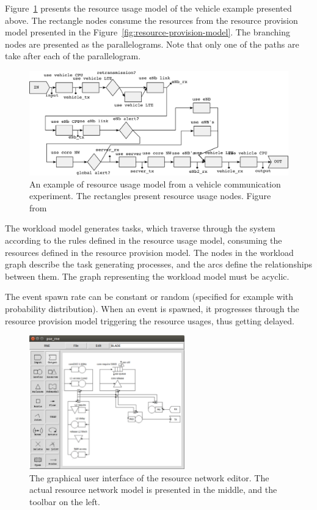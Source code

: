 Figure~\ref{fig:resource-usage-model} presents the resource usage model of the vehicle example presented above. The rectangle nodes consume the resources from the resource provision model presented in the Figure~\ref{fig:resource-provision-model}. The branching nodes are presented as the parallelograms. Note that only one of the paths are take after each of the parallelogram.

\begin{figure}[]
  \begin{center}
    \includegraphics[width=\textwidth]{images/pse-models/pse-tg-example.pdf}
    \caption{An example of resource usage model from a vehicle communication experiment. The rectangles present resource usage nodes. Figure from~\cite{Hanhirova:2014:PSE}}
    \label{fig:resource-usage-model}
  \end{center}
\end{figure}

The workload model generates tasks, which traverse through the system according to the rules defined in the resource usage model, consuming the resources defined in the resource provision model. The nodes in the workload graph describe the task generating processes, and the arcs define the relationships between them. The graph representing the workload model must be acyclic.

The event spawn rate can be constant or random (specified for example with probability distribution). When an event is spawned, it progresses through the resource provision model triggering the resource usages, thus getting delayed.

\begin{figure}[]
  \begin{center}
    \includegraphics[width=0.6\textwidth]{images/rne-example.pdf}
    \caption{The graphical user interface of the resource network editor. The actual resource network model is presented in the middle, and the toolbar on the left.}
    \label{fig:rne-example}
  \end{center}
\end{figure}

